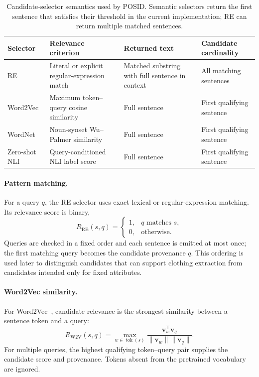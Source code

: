 \documentclass[sigconf,nonacm]{acmart}
\newcommand{\posid}{\textsc{POSID}}
\begin{document}
\begin{table}[t]
    \centering
    \caption{Candidate-selector semantics used by \posid{}.  Semantic
    selectors return the first sentence that satisfies their threshold in the
    current implementation; RE can return multiple matched sentences.}
    \label{tab:selector-semantics}
    \begin{tabular}{p{2.2cm}p{6.3cm}p{3.0cm}p{3.2cm}}
        \toprule
        Selector & Relevance criterion & Returned text & Candidate cardinality \\
        \midrule
        RE & Literal or explicit regular-expression match & Matched substring with full sentence in context & All matching sentences \\
        Word2Vec & Maximum token--query cosine similarity & Full sentence & First qualifying sentence \\
        WordNet & Noun-synset Wu--Palmer similarity & Full sentence & First qualifying sentence \\
        Zero-shot NLI & Query-conditioned NLI label score & Full sentence & First qualifying sentence \\
        \bottomrule
    \end{tabular}
\end{table}

\paragraph{Pattern matching.}
For a query $q$, the RE selector uses exact lexical or regular-expression
matching.  Its relevance score is binary,
\[
R_{\mathrm{RE}}(s,q)=
\begin{cases}
1,& q\text{ matches }s,\\
0,& \text{otherwise.}
\end{cases}
\]
Queries are checked in a fixed order and each sentence is emitted at most once;
the first matching query becomes the candidate provenance $q$.  This ordering
is used later to distinguish candidates that can support clothing extraction
from candidates intended only for fixed attributes.

\paragraph{Word2Vec similarity.}
For Word2Vec~\cite{mikolov2013efficient}, candidate relevance is the strongest
similarity between a sentence token and a query:
\begin{equation}
R_{\mathrm{W2V}}(s,q)
=\max_{w\in\operatorname{tok}(s)}
\frac{\mathbf{v}_w^\top\mathbf{v}_q}
{\lVert\mathbf{v}_w\rVert\lVert\mathbf{v}_q\rVert}.
\label{eq:w2v-score}
\end{equation}
For multiple queries, the highest qualifying token--query pair supplies the
candidate score and provenance.  Tokens absent from the pretrained vocabulary
are ignored.
\end{document}
